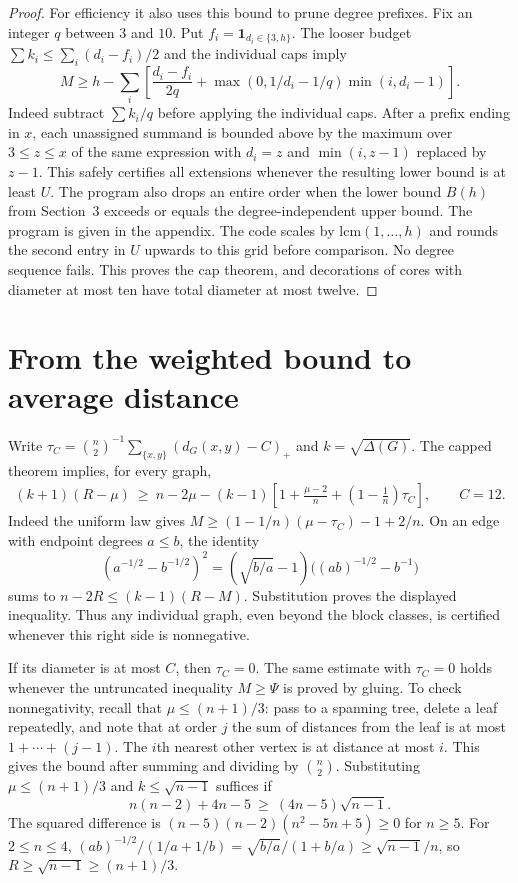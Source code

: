 \documentclass[11pt,a4paper]{article}
\begin{document}
\begin{proof}
For efficiency it also uses this bound to prune degree prefixes. Fix an
integer $q$ between $3$ and $10$. Put $f_i=\mathbf1_{d_i\in\{3,h\}}$.
The looser budget $\sum k_i\le\sum_i(d_i-f_i)/2$ and the individual
caps imply
\[
 M\ge h-\sum_i\left[
 \frac{d_i-f_i}{2q}
 +\max(0,1/d_i-1/q)\min(i,d_i-1)\right].
\]
Indeed subtract $\sum k_i/q$ before applying the individual caps.
After a prefix ending in $x$, each unassigned summand is bounded above
by the maximum over $3\le z\le x$ of the same expression with
$d_i=z$ and $\min(i,z-1)$ replaced by $z-1$. This safely certifies all
extensions whenever the resulting lower bound is at least $U$.
The program also drops an entire order when the lower bound $B(h)$ from Section~3 exceeds or equals the degree-independent upper bound. The program is given in the appendix. The code scales by $\mathrm{lcm}(1,\ldots,h)$ and rounds the second
entry in $U$ upwards to this grid before comparison. No degree sequence
fails. This proves the cap theorem, and decorations of cores with
diameter at most ten have total diameter at most twelve.
\end{proof}

\section{From the weighted bound to average distance}
Write $\tau_C=\binom{n}{2}^{-1}\sum_{\{x,y\}}(d_G(x,y)-C)_+$ and $k=\sqrt{\Delta(G)}$. The capped theorem implies, for every graph,
\[
 \begin{split}
 (k+1)(R-\mu)\ \ge\ n-2\mu
 -(k-1)\left[1+\frac{\mu-2}{n}
            +\left(1-\frac1n\right)\tau_C\right],
 \qquad C=12.
 \end{split}
\]
Indeed the uniform law gives $M\ge(1-1/n)(\mu-\tau_C)-1+2/n$.
On an edge with endpoint degrees $a\le b$, the identity
\[
 (a^{-1/2}-b^{-1/2})^2=(\sqrt{b/a}-1)\bigl((ab)^{-1/2}-b^{-1}\bigr)
\]
sums to $n-2R\le(k-1)(R-M)$. Substitution proves the displayed inequality. Thus any individual graph, even beyond the block classes, is certified whenever this right side is nonnegative.

If its diameter is at most $C$, then $\tau_C=0$. The same estimate with $\tau_C=0$ holds whenever the untruncated inequality $M\ge\Psi$ is proved by gluing. To check nonnegativity, recall that $\mu\le(n+1)/3$: pass to a spanning tree, delete a leaf repeatedly, and note that at order $j$ the sum of distances from the leaf is at most $1+\cdots+(j-1)$. The $i$th nearest other vertex is at distance at most $i$. This gives the bound after summing and dividing by $\binom n2$. Substituting $\mu\le(n+1)/3$ and $k\le\sqrt{n-1}$ suffices if
\[
 n(n-2)+4n-5\ \ge\ (4n-5)\sqrt{n-1}.
\]
The squared difference is $(n-5)(n-2)(n^2-5n+5)\ge0$ for $n\ge5$. For $2\le n\le4$, $(ab)^{-1/2}/(1/a+1/b)=\sqrt{b/a}/(1+b/a)\ge\sqrt{n-1}/n$, so $R\ge\sqrt{n-1}\ge(n+1)/3$.
\end{document}
